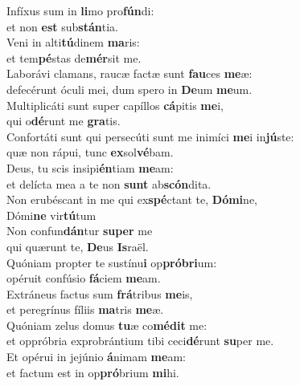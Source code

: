 \evenverse Infíxus sum in \textbf{li}mo pro\textbf{fún}di:~\*\\
\evenverse et non \textbf{est} sub\textbf{stán}tia.\\
\oddverse Veni in alti\textbf{tú}dinem \textbf{ma}ris:~\*\\
\oddverse et tem\textbf{pé}stas de\textbf{mér}sit me.\\
\evenverse Laborávi clamans, raucæ factæ sunt \textbf{fau}ces \textbf{me}æ:~\*\\
\evenverse defecérunt óculi mei, dum spero in \textbf{De}um \textbf{me}um.\\
\oddverse Multiplicáti sunt super capíllos \textbf{cá}pitis \textbf{me}i,~\*\\
\oddverse qui o\textbf{dé}runt me \textbf{gra}tis.\\
\evenverse Confortáti sunt qui persecúti sunt me inimíci \textbf{me}i in\textbf{jú}ste:~\*\\
\evenverse quæ non rápui, tunc \textbf{ex}sol\textbf{vé}bam.\\
\oddverse Deus, tu scis insipi\textbf{én}tiam \textbf{me}am:~\*\\
\oddverse et delícta mea a te non \textbf{sunt} ab\textbf{scón}dita.\\
\evenverse Non erubéscant in me qui ex\textbf{spé}ctant te, \textbf{Dó}\textbf{mi}ne,~\*\\
\evenverse Dómi\textbf{ne} vir\textbf{tú}tum\\
\oddverse Non confun\textbf{dán}tur \textbf{su}\textbf{per} me~\*\\
\oddverse qui quærunt te, \textbf{De}us \textbf{Is}raël.\\
\evenverse Quóniam propter te sustínu\textbf{i} op\textbf{pró}\textbf{bri}um:~\*\\
\evenverse opéruit confúsio \textbf{fá}ciem \textbf{me}am.\\
\oddverse Extráneus factus sum \textbf{frá}tribus \textbf{me}is,~\*\\
\oddverse et peregrínus fíliis \textbf{ma}tris \textbf{me}æ.\\
\evenverse Quóniam zelus domus \textbf{tu}æ co\textbf{mé}\textbf{dit} me:~\*\\
\evenverse et oppróbria exprobrántium tibi ceci\textbf{dé}runt \textbf{su}per me.\\
\oddverse Et opérui in jejúnio \textbf{á}nimam \textbf{me}am:~\*\\
\oddverse et factum est in op\textbf{pró}brium \textbf{mi}hi.\\
